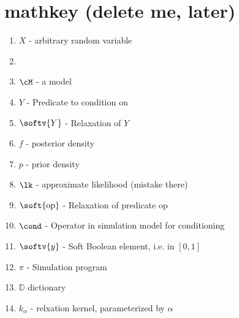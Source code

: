 \section{mathkey (delete me, later)}

\begin{enumerate}
\item $X$ - arbitrary random variable
\item \item $\cM$ - a model
\item $Y$ - Predicate to condition on
\item $\softv{Y}$ - Relaxation of $Y$ 
\item $f$ - posterior density
\item $p$ - prior density
\item $\lk$ - approximate likelihood (mistake there)
\item $\soft{\textrm{op}}$ - Relaxation of predicate $\textrm{op}$
\item $\cond$ - Operator in simulation model for conditioning
\item $\softv{y}$ - Soft Boolean element, i.e. in $[0, 1]$
\item $\pi$ - Simulation program
\item $\mathbb{D}$ dictionary
\item $k_\alpha$ - relxation kernel, parameterized by $\alpha$
\end{enumerate}